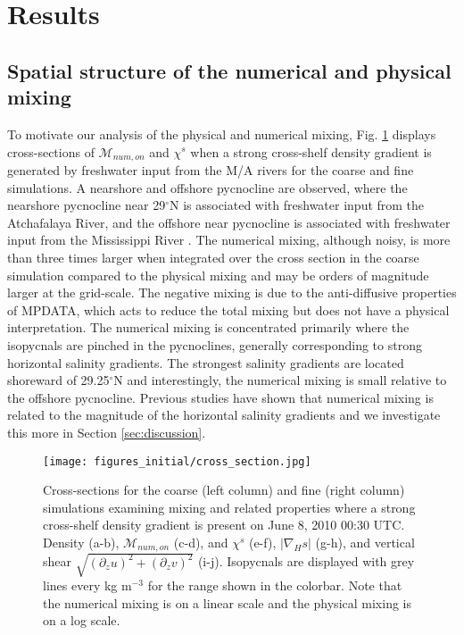 \documentclass[draft]{agujournal2019}
\begin{document}
\section{Results} \label{sec:results}

\subsection{Spatial structure of the numerical and physical mixing}

To motivate our analysis of the physical and numerical mixing, Fig. \ref{fig:cross_section} displays cross-sections of $\mathcal{M}_{num, on}$ and $\chi^s$ when a strong cross-shelf density gradient is generated by freshwater input from the M/A rivers for the coarse and fine simulations. A nearshore and offshore pycnocline are observed, where the nearshore pycnocline near 29$^\circ$N is associated with freshwater input from the Atchafalaya River, and the offshore near pycnocline is associated with freshwater input from the Mississippi River \cite{Kobashi_2020}. The numerical mixing, although noisy, is more than three times larger when integrated over the cross section in the coarse simulation compared to the physical mixing and may be orders of magnitude larger at the grid-scale. The negative mixing is due to the anti-diffusive properties of MPDATA, which acts to reduce the total mixing but does not have a physical interpretation. The numerical mixing is concentrated primarily where the isopycnals are pinched in the pycnoclines, generally corresponding to strong horizontal salinity gradients. The strongest salinity gradients are located shoreward of 29.25$^{\circ}$N and interestingly, the numerical mixing is small relative to the offshore pycnocline. Previous studies have shown that numerical mixing is related to the magnitude of the horizontal salinity gradients \cite{Kalra_2019, Wang_2021} and we investigate this more in Section \ref{sec:discussion}.

\begin{figure}[ht!]
 \centerline{\texttt{[image: figures\_initial/cross\_section.jpg]}}
  \caption{Cross-sections for the coarse (left column) and fine (right column) simulations examining mixing and related properties where a strong cross-shelf density gradient is present on June 8, 2010 00:30 UTC. Density (a-b), $\mathcal{M}_{num, on}$ (c-d), and $\chi^s$ (e-f), $|\nabla_H s|$ (g-h), and vertical shear $\sqrt{(\partial_z u)^2+(\partial_z v)^2}$ (i-j). Isopycnals are displayed with grey lines every kg m$^{-3}$ for the range shown in the colorbar. Note that the numerical mixing is on a linear scale and the physical mixing is on a log scale.}
  \label{fig:cross_section}
\end{figure}
\end{document}
